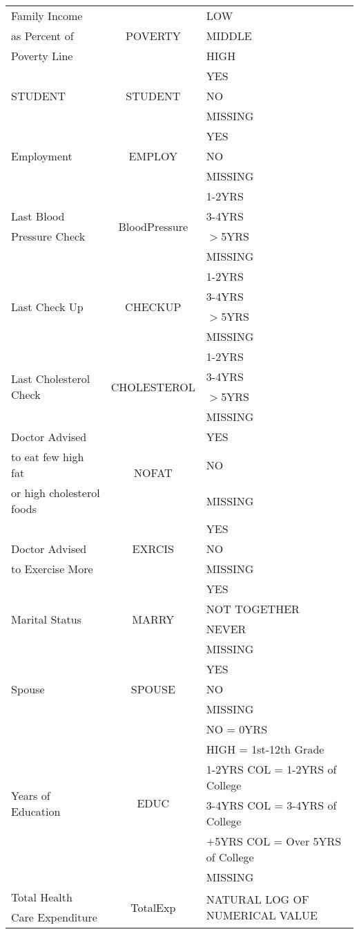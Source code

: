 \documentclass[11pt,twocolumn]{article}
\begin{document}
\newpage
\begin{center}
\begin{tabular}{|p{4cm}|c|p{7.7cm}|}
\hline
Family Income & \multirow{3}{*}{POVERTY} & LOW \\
as Percent of && MIDDLE\\
Poverty Line&&HIGH\\ \hline
\multirow{3}{*}{STUDENT} & \multirow{3}{*}{STUDENT} & YES \\
&& NO\\
&&MISSING\\\hline
\multirow{3}{*}{Employment} & \multirow{3}{*}{EMPLOY} & YES \\
&& NO\\
&&MISSING\\\hline
& \multirow{4}{*}{BloodPressure} & 1-2YRS \\
Last Blood&& 3-4YRS\\
Pressure Check&& $>$5YRS\\
&&MISSING\\ \hline
\multirow{4}{*}{Last Check Up} & \multirow{4}{*}{CHECKUP} & 1-2YRS \\
&& 3-4YRS\\
&& $>$5YRS\\
&&MISSING\\ \hline
\multirow{4}{*}{Last Cholesterol Check} & \multirow{4}{*}{CHOLESTEROL} & 1-2YRS \\
&& 3-4YRS\\
&& $>$5YRS\\
&&MISSING\\ \hline
Doctor Advised & \multirow{3}{*}{NOFAT} & YES \\
to eat few high fat&& NO\\
or high cholesterol foods&&MISSING\\\hline
& \multirow{3}{*}{EXRCIS} & YES \\
Doctor Advised && NO\\
to Exercise More&&MISSING\\\hline
\multirow{4}{*}{Marital Status} & \multirow{4}{*}{MARRY} & YES \\
&& NOT TOGETHER\\
&& NEVER\\
&& MISSING\\ \hline
\multirow{3}{*}{Spouse} & \multirow{3}{*}{SPOUSE} & YES \\
&& NO\\
&&MISSING\\\hline
\multirow{6}{*}{Years of Education} & \multirow{6}{*}{EDUC} & NO = 0YRS \\
&& HIGH = 1st-12th Grade\\
&& 1-2YRS COL = 1-2YRS of College\\
&&3-4YRS COL = 3-4YRS of College\\
&&$+$5YRS COL = Over 5YRS of College\\
&&MISSING\\ \hline
Total Health& \multirow{2}{*}{TotalExp} &\multirow{2}{*}{NATURAL LOG OF NUMERICAL VALUE }\\
Care Expenditure &&\\\hline
\end{tabular}
\end{center}
 
\end{document}
